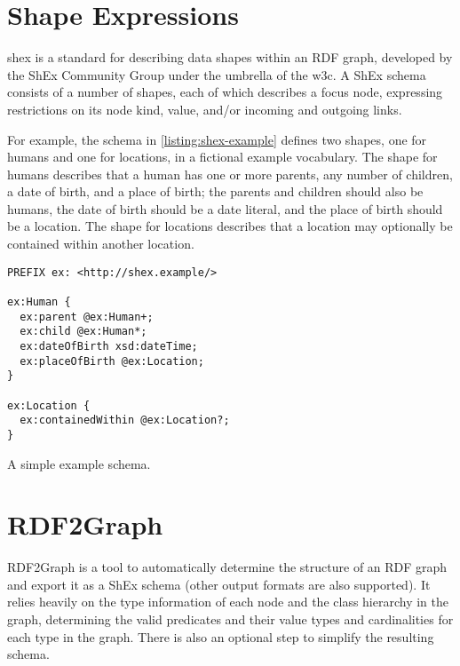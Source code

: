 
\section{Shape Expressions}
\label{ch:Background:ShEx}

\acrfull{shex} \cite{shex}
is a standard for describing data shapes within an RDF graph,
developed by the ShEx Community Group under the umbrella of the \gls{w3c}.
A ShEx schema consists of a number of shapes,
each of which describes a focus node,
expressing restrictions on its node kind, value, and/or incoming and outgoing links.

For example, the schema in \cref{listing:shex-example} defines two shapes,
one for humans and one for locations,
in a fictional example vocabulary.
The shape for humans describes that a human has one or more parents,
any number of children,
a date of birth,
and a place of birth;
the parents and children should also be humans,
the date of birth should be a date literal,
and the place of birth should be a location.
The shape for locations describes that a location may optionally be contained within another location.

\begin{lstfloat}
\begin{lstlisting}[language=sparql]
PREFIX ex: <http://shex.example/>

ex:Human {
  ex:parent @ex:Human+;
  ex:child @ex:Human*;
  ex:dateOfBirth xsd:dateTime;
  ex:placeOfBirth @ex:Location;
}

ex:Location {
  ex:containedWithin @ex:Location?;
}
\end{lstlisting}
\caption{A simple example schema.}
\label{listing:shex-example}
\end{lstfloat}


\section{RDF2Graph}
\label{ch:Background:RDF2Graph}


RDF2Graph %
\cite{vanDam2015}
is a tool to automatically determine the structure of an RDF graph
and export it as a ShEx %
schema (other output formats are also supported).
It relies heavily on the type information of each node and the class hierarchy in the graph,
determining the valid predicates and their value types and cardinalities for each type in the graph.
There is also an optional step to simplify the resulting schema.

